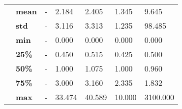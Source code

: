 \begin{tabularx}{\linewidth}{lXXXXXX}
           & \textbf{mean} &             - &      2.184 &       2.405 &              1.345 &     9.645 \\
           & \textbf{std} &             - &      3.116 &       3.313 &              1.235 &    98.485 \\
           & \textbf{min} &             - &      0.000 &       0.000 &              0.000 &     0.000 \\
           & \textbf{25\%} &             - &      0.450 &       0.515 &              0.425 &     0.500 \\
           & \textbf{50\%} &             - &      1.000 &       1.075 &              1.000 &     0.960 \\
           & \textbf{75\%} &             - &      3.000 &       3.160 &              2.335 &     1.832 \\
           & \textbf{max} &             - &     33.474 &      40.589 &             10.000 &  3100.000 \\
\bottomrule
\end{tabularx}
